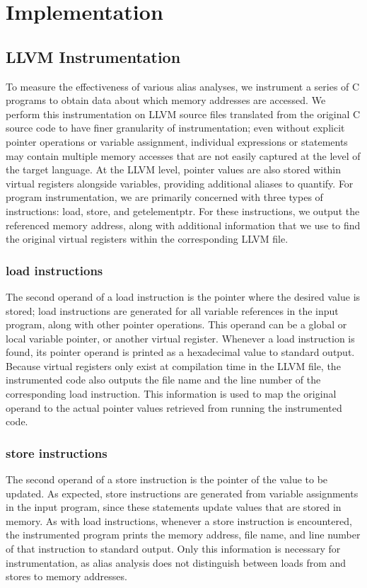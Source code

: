 \chapter{Implementation}

\section{LLVM Instrumentation}
To measure the effectiveness of various alias analyses, we instrument a series of C programs to obtain data about which memory addresses are accessed. We perform this instrumentation on LLVM source files translated from the original C source code to have finer granularity of instrumentation; even without explicit pointer operations or variable assignment, individual expressions or statements may contain multiple memory accesses that are not easily captured at the level of the target language. At the LLVM level, pointer values are also stored within virtual registers alongside variables, providing additional aliases to quantify. For program instrumentation, we are primarily concerned with three types of instructions: load, store, and getelementptr. For these instructions, we output the referenced memory address, along with additional information that we use to find the original virtual registers within the corresponding LLVM file.

\subsection{load instructions}
The second operand of a load instruction is the pointer where the desired value is stored; load instructions are generated for all variable references in the input program, along with other pointer operations. This operand can be a global or local variable pointer, or another virtual register. Whenever a load instruction is found, its pointer operand is printed as a hexadecimal value to standard output. Because virtual registers only exist at compilation time in the LLVM file, the instrumented code also outputs the file name and the line number of the corresponding load instruction. This information is used to map the original operand to the actual pointer values retrieved from running the instrumented code.

\subsection{store instructions}
The second operand of a store instruction is the pointer of the value to be updated. As expected, store instructions are generated from variable assignments in the input program, since these statements update values that are stored in memory. As with load instructions, whenever a store instruction is encountered, the instrumented program prints the memory address, file name, and line number of that instruction to standard output. Only this information is necessary for instrumentation, as alias analysis does not distinguish between loads from and stores to memory addresses.

